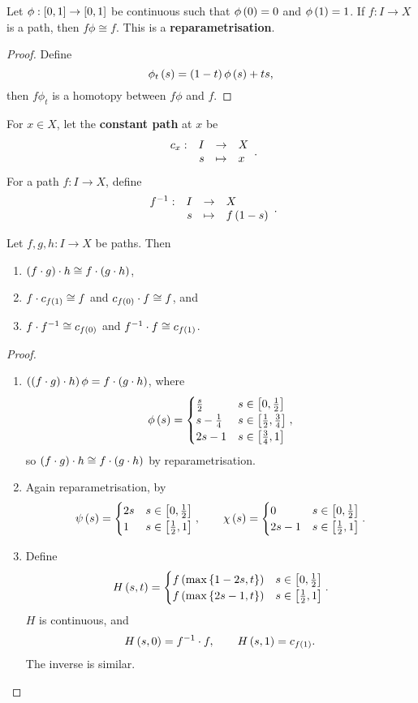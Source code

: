 \begin{remark*}
Let $ \phi : \sb{0, 1} \to \sb{0, 1} $ be continuous such that $ \phi\rb{0} = 0 $ and $ \phi\rb{1} = 1 $. If $ f : I \to X $ is a path, then $ f\phi \cong f $. This is a \textbf{reparametrisation}.
\end{remark*}

\begin{proof}
Define
$$ \phi_t\rb{s} = \rb{1 - t}\phi\rb{s} + ts, $$
then $ f\phi_t $ is a homotopy between $ f\phi $ and $ f $.
\end{proof}

For $ x \in X $, let the \textbf{constant path} at $ x $ be
$$ \function[c_x]{I}{X}{s}{x}. $$
For a path $ f : I \to X $, define
$$ \function[f^{-1}]{I}{X}{s}{f\rb{1 - s}}. $$

\begin{lemma}
\label{lem:1.3}
Let $ f, g, h : I \to X $ be paths. Then
\begin{enumerate}
\item $ \rb{f \cdot g} \cdot h \cong f \cdot \rb{g \cdot h} $,
\item $ f \cdot c_{f\rb{1}} \cong f $ and $ c_{f\rb{0}} \cdot f \cong f $, and
\item $ f \cdot f^{-1} \cong c_{f\rb{0}} $ and $ f^{-1} \cdot f \cong c_{f\rb{1}} $.
\end{enumerate}
\end{lemma}

\begin{proof}
\hfill
\begin{enumerate}
\item $ \rb{\rb{f \cdot g} \cdot h}\phi = f \cdot \rb{g \cdot h} $, where
$$ \phi\rb{s} =
\begin{cases}
\tfrac{s}{2} & s \in \sb{0, \tfrac{1}{2}} \\
s - \tfrac{1}{4} & s \in \sb{\tfrac{1}{2}, \tfrac{3}{4}} \\
2s - 1 & s \in \sb{\tfrac{3}{4}, 1}
\end{cases},
$$
so $ \rb{f \cdot g} \cdot h \cong f \cdot \rb{g \cdot h} $ by reparametrisation.
\item Again reparametrisation, by
$$ \psi\rb{s} =
\begin{cases}
2s & s \in \sb{0, \tfrac{1}{2}} \\
1 & s \in \sb{\tfrac{1}{2}, 1}
\end{cases},
\qquad \chi\rb{s} =
\begin{cases}
0 & s \in \sb{0, \tfrac{1}{2}} \\
2s - 1 & s \in \sb{\tfrac{1}{2}, 1}
\end{cases}.
$$
\item Define
$$ H\rb{s, t} =
\begin{cases}
f\rb{\max\cb{1 - 2s, t}} & s \in \sb{0, \tfrac{1}{2}} \\
f\rb{\max\cb{2s - 1, t}} & s \in \sb{\tfrac{1}{2}, 1}
\end{cases}.
$$
$ H $ is continuous, and
$$ H\rb{s, 0} = f^{-1} \cdot f, \qquad H\rb{s, 1} = c_{f\rb{1}}. $$
The inverse is similar.
\end{enumerate}
\end{proof}

